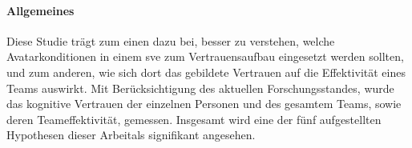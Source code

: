\documentclass[a4paper,11pt]{article}%
\renewcommand{\\}{\vspace*{0.5\baselineskip} \newline}
\begin{document}
\paragraph{Allgemeines}
	Diese Studie trägt zum einen dazu bei, besser zu verstehen, welche Avatarkonditionen in einem \ac{sve} zum Vertrauensaufbau eingesetzt werden sollten, und zum anderen, wie sich dort das gebildete Vertrauen auf die Effektivität eines Teams auswirkt. Mit Berücksichtigung des aktuellen Forschungsstandes, wurde das kognitive Vertrauen der einzelnen Personen und des gesamtem Teams, sowie deren Teameffektivität, gemessen. Insgesamt wird eine der fünf aufgestellten Hypothesen dieser Arbeitals signifikant angesehen.








%

\end{document}

